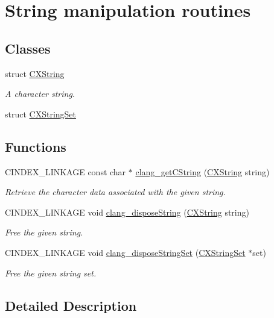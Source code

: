 \hypertarget{group__CINDEX__STRING}{}\section{String manipulation routines}
\label{group__CINDEX__STRING}
\subsection*{Classes}
\begin{DoxyCompactItemize}
\item 
struct \mbox{\hyperlink{structCXString}{C\+X\+String}}
\begin{DoxyCompactList}\small\item\em A character string. \end{DoxyCompactList}\item 
struct \mbox{\hyperlink{structCXStringSet}{C\+X\+String\+Set}}
\end{DoxyCompactItemize}
\subsection*{Functions}
\begin{DoxyCompactItemize}
\item 
\mbox{\label{group__CINDEX__STRING_gafd043aa189e990b9e327e9f95a1da8a5}} 
C\+I\+N\+D\+E\+X\+\_\+\+L\+I\+N\+K\+A\+GE const char $\ast$ \mbox{\hyperlink{group__CINDEX__STRING_gafd043aa189e990b9e327e9f95a1da8a5}{clang\+\_\+get\+C\+String}} (\mbox{\hyperlink{structCXString}{C\+X\+String}} string)
\begin{DoxyCompactList}\small\item\em Retrieve the character data associated with the given string. \end{DoxyCompactList}\item 
\mbox{\label{group__CINDEX__STRING_gaeff715b329ded18188959fab3066048f}} 
C\+I\+N\+D\+E\+X\+\_\+\+L\+I\+N\+K\+A\+GE void \mbox{\hyperlink{group__CINDEX__STRING_gaeff715b329ded18188959fab3066048f}{clang\+\_\+dispose\+String}} (\mbox{\hyperlink{structCXString}{C\+X\+String}} string)
\begin{DoxyCompactList}\small\item\em Free the given string. \end{DoxyCompactList}\item 
\mbox{\label{group__CINDEX__STRING_gabece1342b7aeba281b56edadced65ac9}} 
C\+I\+N\+D\+E\+X\+\_\+\+L\+I\+N\+K\+A\+GE void \mbox{\hyperlink{group__CINDEX__STRING_gabece1342b7aeba281b56edadced65ac9}{clang\+\_\+dispose\+String\+Set}} (\mbox{\hyperlink{structCXStringSet}{C\+X\+String\+Set}} $\ast$set)
\begin{DoxyCompactList}\small\item\em Free the given string set. \end{DoxyCompactList}\end{DoxyCompactItemize}


\subsection{Detailed Description}
